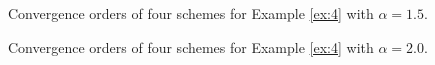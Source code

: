 \documentclass[preprint,compress,3p,10pt,fleqn]{elsarticle}
\numberwithin{equation}{section}
\begin{document}
\begin{figure}[H]
\begin{center}
\caption{Convergence orders of four schemes for Example \ref{ex:4} with $\alpha=1.5$.} \label{fig:7}
\end{center}
\end{figure}

\begin{figure}[H]
\begin{center}
\caption{Convergence orders of four schemes for Example \ref{ex:4} with $\alpha=2.0$.} \label{fig:8}
\end{center}
\end{figure}
\end{document}
